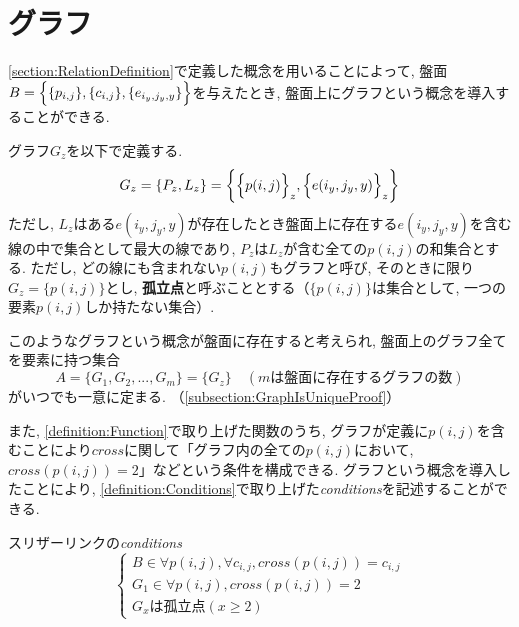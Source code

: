 \section{グラフ}\label{section:GraphDefinition}
\cref{section:RelationDefinition}で定義した概念を用いることによって, 盤面$B=\Bigl\{\{p_{i,j}\},\{c_{i,j}\},\{e_{i_y,j_y,y}\}\Bigr\}$を与えたとき, 盤面上にグラフという概念を導入することができる.

\begin{definition}[グラフ]\label{definition:GraphDefinition}
  グラフ$G_z$を以下で定義する.
  \begin{equation*}
    G_z=\{P_z,L_z\}=\biggl\{  \Bigl\{p(i,j)\Bigr\}_z,\Bigl\{e(i_y,j_y,y)\Bigr\}_z\biggr\}
  \end{equation*}
  ただし, $L_z$はある$e(i_y,j_y,y)$が存在したとき盤面上に存在する$e(i_y,j_y,y)$を含む線の中で集合として最大の線であり,  $P_z$は$L_z$が含む全ての$p(i,j)$の和集合とする. ただし, どの線にも含まれない$p(i,j)$もグラフと呼び, そのときに限り$G_z=\{p(i,j)\}$とし, \textbf{孤立点}と呼ぶこととする（$\{p(i,j)\}$は集合として, 一つの要素$p(i,j)$しか持たない集合）.
\end{definition}

このようなグラフという概念が盤面に存在すると考えられ, 盤面上のグラフ全てを要素に持つ集合
\begin{equation*}
  A=\{G_1,G_2,...,G_m\}=\{G_z\}\quad (mは盤面に存在するグラフの数)
\end{equation*}
がいつでも一意に定まる. （\cref{subsection:GraphIsUniqueProof}）

また, \cref{definition:Function}で取り上げた関数のうち, グラフが定義に$p(i,j)$を含むことにより$\textit{cross}$に関して「グラフ内の全ての$p(i,j)$において, $\textit{cross}(p(i,j))=2$」などという条件を構成できる. グラフという概念を導入したことにより, \cref{definition:Conditions}で取り上げた\textit{conditions}を記述することができる.
\begin{example}\textup{スリザーリンクの\textit{conditions}}\label{example:SlitherLinkConditions}
  \begin{equation*}
    \begin{cases}
      {B\in \forall p(i,j)   ,  \forall c_{i,j} , \textit{cross}(p(i,j))=c_{i,j} } \\
      {G_1\in \forall p(i,j)            , \textit{cross}(p(i,j))=2       }         \\
      {G_xは孤立点(x\geq 2)}
    \end{cases}
  \end{equation*}
\end{example}

